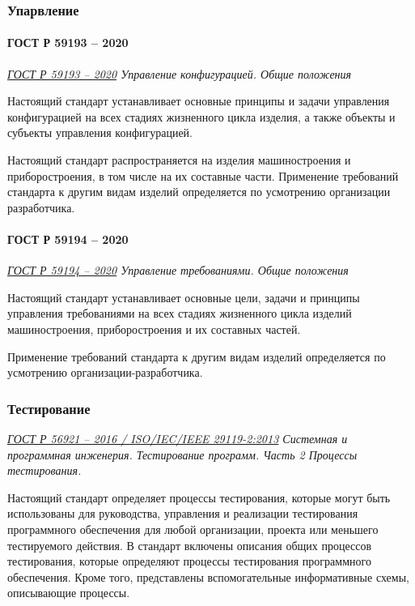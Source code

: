 \subsubsection{Упарвление}

\paragraph{ГОСТ Р 59193 -- 2020}

\emph{\href{https://docs.cntd.ru/document/1200177489}{ГОСТ Р 59193 -- 2020}
Управление конфигурацией. Общие положения
}

Настоящий стандарт устанавливает основные принципы
и задачи управления конфигурацией на всех стадиях жизненного цикла изделия,
а также объекты и субъекты управления конфигурацией.

Настоящий стандарт распространяется на изделия машиностроения
и приборостроения, в том числе на их составные части.
Применение требований стандарта к другим видам изделий определяется
по усмотрению организации разработчика.

\paragraph{ГОСТ Р 59194 -- 2020}

\emph{\href{https://docs.cntd.ru/document/573219705}{ГОСТ Р 59194 -- 2020}
Управление требованиями. Общие положения
}

Настоящий стандарт устанавливает основные цели,
задачи и принципы управления требованиями
на всех стадиях жизненного цикла изделий машиностроения,
приборостроения и их составных частей.

Применение требований стандарта к другим видам изделий определяется
по усмотрению организации-разработчика.

\subsubsection{Тестирование}

\emph{\href{https://docs.cntd.ru/document/1200134997}
{ГОСТ Р 56921 -- 2016 / ISO/IEC/IEEE 29119-2:2013}
Системная и программная инженерия.
Тестирование программ.
Часть 2 Процессы тестирования.
}

Настоящий стандарт определяет процессы тестирования,
которые могут быть использованы для руководства,
управления и реализации тестирования программного обеспечения
для любой организации, проекта или меньшего тестируемого действия.
В стандарт включены описания общих процессов тестирования,
которые определяют процессы тестирования программного обеспечения.
Кроме того, представлены вспомогательные информативные схемы,
описывающие процессы.


